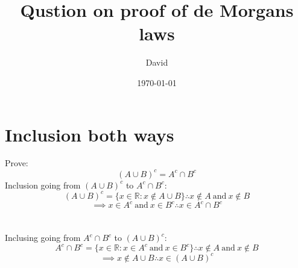\documentclass{article}
\title{Qustion on proof of de Morgans laws}
\author{David}
\date{\today}
\begin{document}
\maketitle
\section{Inclusion both ways}
Prove:
\begin{equation}
    (A \cup B)^c=A^c \cap B^c
\end{equation}
Inclusion going from $(A \cup B)^c$ to $A^c \cap B^c$:\\
\begin{equation}
    (A \cup B)^c=\{x \in \mathbb{R} : x \notin A \cup B\} \therefore x \notin A \ \text{and} \ x \notin B
\end{equation}
\begin{equation}
    \implies x \in A^c \ \text{and} \ x \in B^c \therefore x \in A^c \cap B^c
\end{equation}
\\\\
Inclusing going from $A^c \cap B^c$ to $(A \cup B)^c$:\\
\begin{equation}
    A^c \cap B^c = \{x \in \mathbb{R} : x \in A^c \ \text{and} \ x \in B^c\} \therefore x \notin A \ \text{and} \ x \notin B 
\end{equation}
\begin{equation}
    \implies x \notin A \cup B \therefore x \in (A \cup B)^c
\end{equation}
\end{document}
